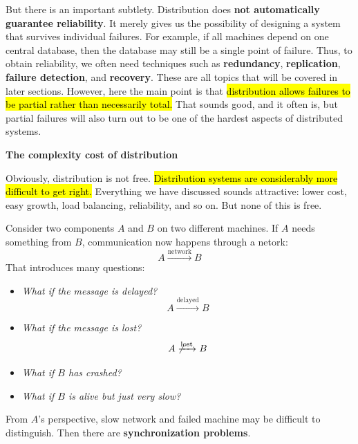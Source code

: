 \highspace
But there is an important subtlety. Distribution does \textbf{not automatically guarantee reliability}. It merely gives us the possibility of designing a system that survives individual failures. For example, if all machines depend on one central database, then the database may still be a single point of failure. Thus, to obtain reliability, we often need techniques such as \textbf{redundancy}, \textbf{replication}, \textbf{failure detection}, and \textbf{recovery}. These are all topics that will be covered in later sections. However, here the main point is that \hl{distribution allows failures to be partial rather than necessarily total.} That sounds good, and it often is, but partial failures will also turn out to be one of the hardest aspects of distributed systems.

\highspace
\begin{flushleft}
    \textcolor{Red2}{ \textbf{The complexity cost of distribution}}
\end{flushleft}
Obviously, distribution is not free. \hl{Distribution systems are considerably more difficult to get right.} Everything we have discussed sounds attractive: lower cost, easy growth, load balancing, reliability, and so on. But none of this is free.

\highspace
Consider two components $A$ and $B$ on two different machines. If $A$ needs something from $B$, communication now happens through a netork:
\begin{equation*}
    A \xrightarrow{\text{network}} B
\end{equation*}
That introduces many questions:
\begin{itemize}
    \item \emph{What if the message is delayed?}
        \begin{equation*}
            A \xrightarrow{\text{delayed}} B
        \end{equation*}
    \item \emph{What if the message is lost?}
        \begin{equation*}
            A \not\xrightarrow{\text{lost}} B
        \end{equation*}
    \item \emph{What if $B$ has crashed?}
    \item \emph{What if $B$ is alive but just very slow?}
\end{itemize}
From $A$'s perspective, slow network and failed machine may be difficult to distinguish. Then there are \textbf{synchronization problems}.

